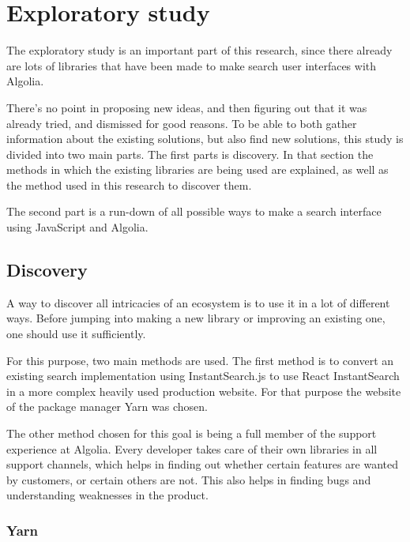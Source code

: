 
\chapter{Exploratory study} %
\label{chp:exploratory_study}

The exploratory study is an important part of this research, since there already are lots of libraries that have been made to make search user interfaces with Algolia.

There's no point in proposing new ideas, and then figuring out that it was already tried, and dismissed for good reasons. To be able to both gather information about the existing solutions, but also find new solutions, this study is divided into two main parts. The first parts is discovery. In that section the methods in which the existing libraries are being used are explained, as well as the method used in this research to discover them. 

The second part is a run-down of all possible ways to make a search interface using JavaScript and Algolia. 

\section{Discovery}
\label{sec:discovery}

A way to discover all intricacies of an ecosystem is to use it in a lot of different ways. Before jumping into making a new \gls{library} or improving an existing one, one should use it sufficiently.

For this purpose, two main methods are used. The first method is to convert an existing search implementation using InstantSearch.js\cite{instantsearch-js} to use React InstantSearch in a more complex heavily used production website. For that purpose the website of the package manager Yarn\cite{yarn-site} was chosen.

The other method chosen for this goal is being a full member of the support experience at Algolia. Every developer takes care of their own libraries in all support channels, which helps in finding out whether certain features are wanted by customers, or certain others are not. This also helps in finding bugs and understanding weaknesses in the product.

\subsection{Yarn} %
\label{ssec:yarn}

